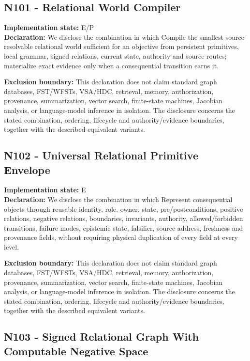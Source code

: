 \documentclass[
  10pt,
  letterpaper,
]{article}
\begin{document}
\subsection{N101 - Relational World
Compiler}\label{n101---relational-world-compiler}

\textbf{Implementation state:} E/P\\
\textbf{Declaration:} We disclose the combination in which Compile the
smallest source-resolvable relational world sufficient for an objective
from persistent primitives, local grammar, signed relations, current
state, authority and source routes; materialize exact evidence only when
a consequential transition earns it.

\textbf{Exclusion boundary:} This declaration does not claim standard
graph databases, FST/WFSTs, VSA/HDC, retrieval, memory, authorization,
provenance, summarization, vector search, finite-state machines,
Jacobian analysis, or language-model inference in isolation. The
disclosure concerns the stated combination, ordering, lifecycle and
authority/evidence boundaries, together with the described equivalent
variants.

\subsection{N102 - Universal Relational Primitive
Envelope}\label{n102---universal-relational-primitive-envelope}

\textbf{Implementation state:} E\\
\textbf{Declaration:} We disclose the combination in which Represent
consequential objects through reusable identity, role, owner, state,
pre/postconditions, positive relations, negative relations, boundaries,
invariants, authority, allowed/forbidden transitions, failure modes,
epistemic state, falsifier, source address, freshness and provenance
fields, without requiring physical duplication of every field at every
level.

\textbf{Exclusion boundary:} This declaration does not claim standard
graph databases, FST/WFSTs, VSA/HDC, retrieval, memory, authorization,
provenance, summarization, vector search, finite-state machines,
Jacobian analysis, or language-model inference in isolation. The
disclosure concerns the stated combination, ordering, lifecycle and
authority/evidence boundaries, together with the described equivalent
variants.

\subsection{N103 - Signed Relational Graph With Computable Negative
Space}\label{n103---signed-relational-graph-with-computable-negative-space}
\end{document}
